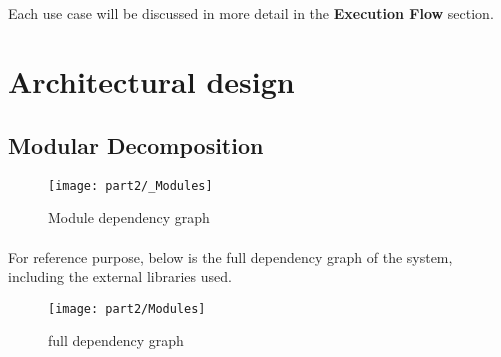 \documentclass[../gr-final.tex]{subfiles}
\begin{document}
\paragraph{} Each use case will be discussed in more detail in
the {\bfseries Execution Flow} section.


\section{Architectural design}
\subsection{Modular Decomposition}
\begin{figure}[H]
\texttt{[image: part2/\_Modules]}
\caption{Module dependency graph}
\end{figure}
\paragraph{}For reference purpose, below is the full dependency
graph of the system, including the external libraries used.
\begin{figure}[H]
\texttt{[image: part2/Modules]}
\caption{full dependency graph}
\end{figure}
\end{document}

